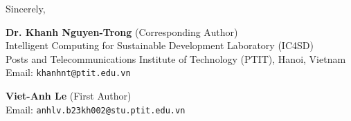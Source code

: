\documentclass[10.5pt,a4paper]{article}
\begin{document}
\vspace{6mm}
\noindent
Sincerely,

\vspace{3mm}
\noindent
\textbf{Dr. Khanh Nguyen-Trong} (Corresponding Author) \\
Intelligent Computing for Sustainable Development Laboratory (IC4SD) \\
Posts and Telecommunications Institute of Technology (PTIT), Hanoi, Vietnam \\
Email: \texttt{khanhnt@ptit.edu.vn}

\vspace{3mm}
\noindent
\textbf{Viet-Anh Le} (First Author) \\
Email: \texttt{anhlv.b23kh002@stu.ptit.edu.vn}
\end{document}
